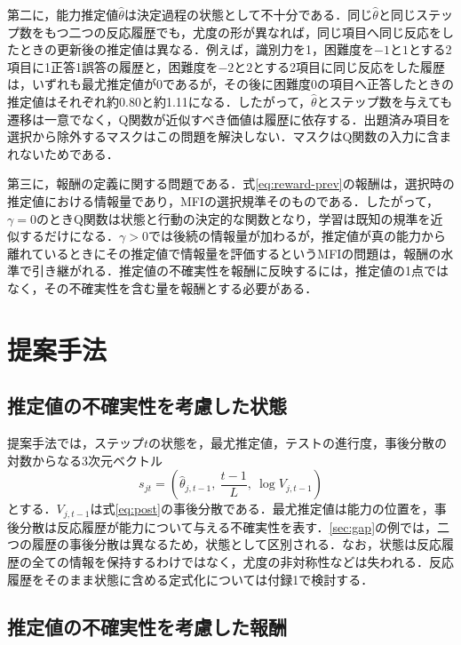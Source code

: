 \documentclass[a4paper,12pt,oneside,openany]{jsbook}
\begin{document}
第二に，能力推定値$\hat\theta$は決定過程の状態として不十分である．同じ$\hat\theta$と同じステップ数をもつ二つの反応履歴でも，尤度の形が異なれば，同じ項目へ同じ反応をしたときの更新後の推定値は異なる．例えば，識別力を1，困難度を$-1$と$1$とする2項目に1正答1誤答の履歴と，困難度を$-2$と$2$とする2項目に同じ反応をした履歴は，いずれも最尤推定値が0であるが，その後に困難度0の項目へ正答したときの推定値はそれぞれ約0.80と約1.11になる．したがって，$\hat\theta$とステップ数を与えても遷移は一意でなく，Q関数が近似すべき価値は履歴に依存する．出題済み項目を選択から除外するマスクはこの問題を解決しない．マスクはQ関数の入力に含まれないためである．

第三に，報酬の定義に関する問題である．式\eqref{eq:reward-prev}の報酬は，選択時の推定値における情報量であり，MFIの選択規準そのものである．したがって，$\gamma=0$のときQ関数は状態と行動の決定的な関数となり，学習は既知の規準を近似するだけになる．$\gamma>0$では後続の情報量が加わるが，推定値が真の能力から離れているときにその推定値で情報量を評価するというMFIの問題は，報酬の水準で引き継がれる．推定値の不確実性を報酬に反映するには，推定値の1点ではなく，その不確実性を含む量を報酬とする必要がある．

\chapter{提案手法}\label{sec:prop}

\section{推定値の不確実性を考慮した状態}\label{sec:belief}

提案手法では，ステップ$t$の状態を，最尤推定値，テストの進行度，事後分散の対数からなる3次元ベクトル
\begin{equation}
 s_{jt}=\left(\hat\theta_{j,t-1},\ \frac{t-1}{L},\ \log V_{j,t-1}\right)
 \label{eq:state}
\end{equation}
とする．$V_{j,t-1}$は式\eqref{eq:post}の事後分散である．最尤推定値は能力の位置を，事後分散は反応履歴が能力について与える不確実性を表す．\ref{sec:gap}の例では，二つの履歴の事後分散は異なるため，状態として区別される．なお，状態は反応履歴の全ての情報を保持するわけではなく，尤度の非対称性などは失われる．反応履歴をそのまま状態に含める定式化については付録1で検討する．

\section{推定値の不確実性を考慮した報酬}\label{sec:reward}
\end{document}
